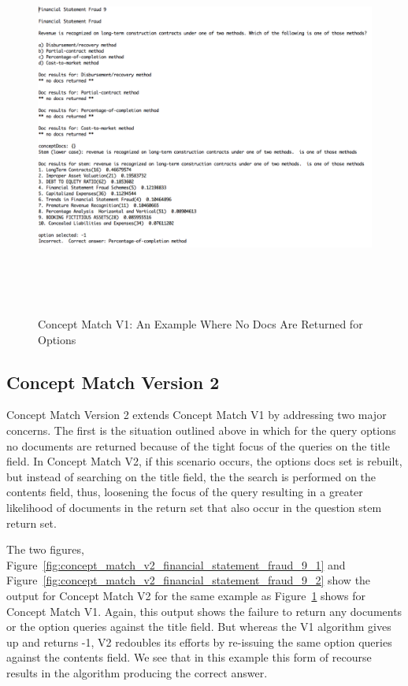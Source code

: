 \begin{figure}
\centering
\vspace{1.0in}
\includegraphics[width=125mm, height=125mm]{concept_match_v1_financial_statement_fraud_9.png}
\caption{Concept Match V1: An Example Where No Docs Are Returned for Options}
\label{fig:concept_match_v1_financial_statement_fraud_9}
\end{figure}


\subsection{Concept Match Version 2}

Concept Match Version 2 extends Concept Match V1 by addressing two major concerns.  The first is the situation outlined above in which for the query options no documents are returned because of the tight focus of the queries on the title field.  In Concept Match V2, if this scenario occurs, the options docs set is rebuilt, but instead of searching on the title field, the the search is performed on the contents field, thus, loosening the focus of the query resulting in a greater likelihood of documents in the return set that also occur in the question stem return set.  

The two figures, Figure~\ref{fig:concept_match_v2_financial_statement_fraud_9_1} and Figure~\ref{fig:concept_match_v2_financial_statement_fraud_9_2}  show the output for Concept Match V2 for the same example as  Figure~\ref{fig:concept_match_v1_financial_statement_fraud_9} shows for Concept Match V1.  Again, this output shows the failure to return any documents or the option queries against the title field.  But whereas the V1 algorithm gives up and returns -1, V2 redoubles its efforts by re-issuing the same option queries against the contents field.  We see that in this example this form of recourse results in the algorithm producing the correct answer.

